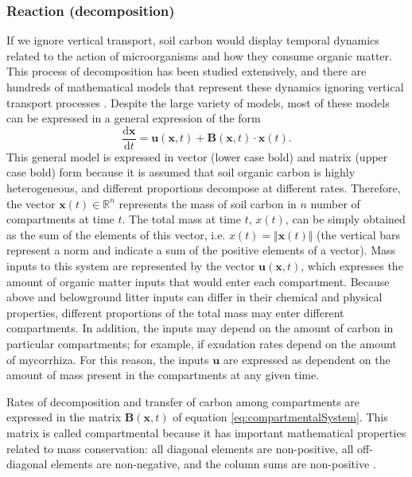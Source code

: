 \documentclass[11pt, oneside, a4paper]{article}   	%
\begin{document}
\subsubsection{Reaction (decomposition)}
If we ignore vertical transport, soil carbon would display temporal dynamics related to the action of microorganisms and how they consume organic matter. This process of decomposition has been studied extensively, and there are hundreds of mathematical models that represent these dynamics ignoring vertical transport processes \citep{Manzoni2009}. Despite the large variety of models, most of these models can be expressed in a general expression of the form \citep{Sierra2015EM, Sierra2018JAMES}
\begin{equation} \label{eq:compartmentalSystem}
\frac{\mathrm{d} \bm{x}}{\mathrm{d}t} = \bm{u}(\bm{x}, t) + \mathbf{B}(\bm{x}, t) \cdot \bm{x}(t) .
\end{equation}
This general model is expressed in vector (lower case bold) and matrix (upper case bold) form because it is assumed that soil organic carbon is highly heterogeneous, and different proportions  decompose at different rates. Therefore, the vector $\bm{x}(t) \in \mathbb{R}^n$ represents the mass of soil carbon in $n$ number of compartments at time $t$. The total mass at time $t$, $x(t)$, can be simply obtained as the sum of the elements of this vector, i.e. $x(t) = \Vert \bm{x}(t) \Vert$ (the vertical bars represent a norm and indicate a sum of the positive elements of a vector). Mass inputs to this system are represented by the vector $\bm{u}(\bm{x}, t)$, which expresses the amount of organic matter inputs that would enter each compartment. Because above and belowground litter inputs can differ in their chemical and physical properties, different proportions of the total mass may enter different compartments. In addition, the inputs may depend on the amount of carbon in particular compartments; for example, if exudation rates depend on the amount of mycorrhiza. For this reason, the inputs $\bm{u}$ are expressed as dependent on the amount of mass present in the compartments at any given time. 

Rates of decomposition and transfer of carbon among compartments are expressed in the matrix $\mathbf{B}(\bm{x}, t)$ of equation \ref{eq:compartmentalSystem}. This matrix is called compartmental because it has important mathematical properties related to mass conservation: all diagonal elements are non-positive, all off-diagonal elements are non-negative, and the column sums are non-positive \citep{Metzler2018MG, Sierra2018JAMES}.
\end{document}
